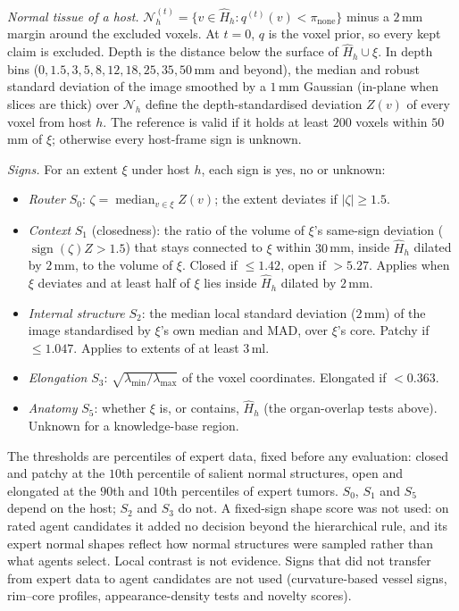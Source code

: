 \documentclass[fleqn,10pt]{olplainarticle}
\begin{document}
\emph{Normal tissue of a host.} $\mathcal{N}^{(t)}_h=\{v\in\hat H_h: q^{(t)}(v)<\pi_{\mathrm{none}}\}$ minus a $2$\,mm margin
around the excluded voxels. At $t=0$, $q$ is the voxel prior, so every kept claim is excluded. Depth is the distance below the
surface of $\hat H_h\cup\xi$. In depth bins ($0,1.5,3,5,8,12,18,25,35,50$\,mm and beyond), the median and robust standard
deviation of the image smoothed by a $1$\,mm Gaussian (in-plane when slices are thick) over $\mathcal{N}_h$ define the
depth-standardised deviation $Z(v)$ of every voxel from host $h$. The reference is valid if it holds at least $200$ voxels within
$50$\,mm of $\xi$; otherwise every host-frame sign is unknown.

\emph{Signs.} For an extent $\xi$ under host $h$, each sign is yes, no or unknown:
\begin{itemize}
\item \emph{Router} $S_0$: $\zeta=\operatorname{median}_{v\in\xi}Z(v)$; the extent deviates if $|\zeta|\ge1.5$.
\item \emph{Context} $S_1$ (closedness): the ratio of the volume of $\xi$'s same-sign deviation ($\operatorname{sign}(\zeta)Z>1.5$)
that stays connected to $\xi$ within $30$\,mm, inside $\hat H_h$ dilated by $2$\,mm, to the volume of $\xi$. Closed if
$\le1.42$, open if $>5.27$. Applies when $\xi$ deviates and at least half of $\xi$ lies inside $\hat H_h$ dilated by $2$\,mm.
\item \emph{Internal structure} $S_2$: the median local standard deviation ($2$\,mm) of the image standardised by $\xi$'s own
median and MAD, over $\xi$'s core. Patchy if $\le1.047$. Applies to extents of at least $3$\,ml.
\item \emph{Elongation} $S_3$: $\sqrt{\lambda_{\min}/\lambda_{\max}}$ of the voxel coordinates. Elongated if $<0.363$.
\item \emph{Anatomy} $S_5$: whether $\xi$ is, or contains, $\hat H_h$ (the organ-overlap tests above). Unknown for a
knowledge-base region.
\end{itemize}
The thresholds are percentiles of expert data, fixed before any evaluation: closed and patchy at the $10$th percentile of
salient normal structures, open and elongated at the $90$th and $10$th percentiles of expert tumors. $S_0$, $S_1$ and $S_5$ depend
on the host; $S_2$ and $S_3$ do not. A fixed-sign shape score was not used: on rated agent candidates it added no
decision beyond the hierarchical rule, and its expert normal shapes reflect how normal structures were sampled rather than what
agents select. Local contrast is not evidence. Signs that did not transfer from expert data to agent
candidates are not used (curvature-based vessel signs, rim--core profiles, appearance-density tests and novelty scores).
\end{document}
